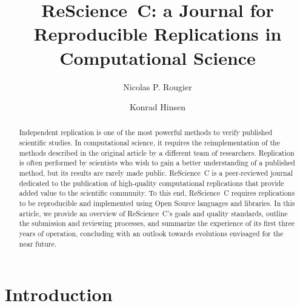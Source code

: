 \documentclass[runningheads]{llncs}
\begin{document}
%
\title{ReScience~C: a Journal for Reproducible Replications in Computational Science}
%

\author{Nicolas P. Rougier \and
Konrad Hinsen}
%
%
%
\maketitle              %
%
\begin{abstract}
  Independent replication is one of the most powerful methods to
  verify published scientific studies.  In computational science, it
  requires the reimplementation of the methods described in the
  original article by a different team of researchers.  Replication is
  often performed by scientists who wish to gain a better
  understanding of a published method, but its results are rarely made
  public. ReScience~C is a peer-reviewed journal dedicated to the
  publication of high-quality computational replications that provide
  added value to the scientific community.  To this end, ReScience~C
  requires replications to be reproducible and implemented using Open
  Source languages and libraries. In this article, we provide an
  overview of ReScience~C's goals and quality standards, outline the
  submission and reviewing processes, and summarize the experience of
  its first three years of operation, concluding with an outlook
  towards evolutions envisaged for the near future.

\end{abstract}
%
\section{Introduction}
\end{document}
